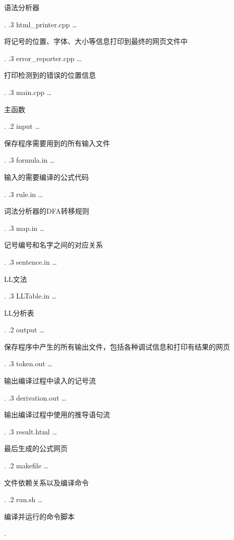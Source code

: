 \documentclass[a4paper]{scrartcl}
\begin{document}
{\begin{minipage}[t]{5cm}
				语法分析器
			\end{minipage}
		.
		.3 html{\_}printer.cpp
		\ldots{}
			\begin{minipage}[t]{6cm}
				将记号的位置、字体、大小等信息打印到最终的网页文件中
			\end{minipage}
		.
		.3 error{\_}reporter.cpp
		\ldots{}
			\begin{minipage}[t]{6cm}
				打印检测到的错误的位置信息
			\end{minipage}
		.
		.3 main.cpp
		\ldots{}
			\begin{minipage}[t]{10cm}
				主函数
			\end{minipage}
		.
	.2 input
	\ldots{}
		\begin{minipage}[t]{10cm}
			保存程序需要用到的所有输入文件
		\end{minipage}
	.
		.3 formula.in
		\ldots{}
			\begin{minipage}[t]{6cm}
				输入的需要编译的公式代码
			\end{minipage}
		.
		.3 rule.in
		\ldots{}
			\begin{minipage}[t]{10cm}
				词法分析器的DFA转移规则
			\end{minipage}
		.
		.3 map.in
		\ldots{}
			\begin{minipage}[t]{10cm}
				记号编号和名字之间的对应关系
			\end{minipage}
		.
		.3 sentence.in
		\ldots{}
			\begin{minipage}[t]{6cm}
				LL文法
			\end{minipage}
		.
		.3 LLTable.in
		\ldots{}
			\begin{minipage}[t]{6cm}
				LL分析表
			\end{minipage}
		.
	.2 output
	\ldots{}
		\begin{minipage}[t]{10cm}
			保存程序中产生的所有输出文件，包括各种调试信息和打印有结果的网页
		\end{minipage}
	.
		.3 token.out
		\ldots{}
			\begin{minipage}[t]{6cm}
				输出编译过程中读入的记号流
			\end{minipage}
		.
		.3 derivation.out
		\ldots{}
			\begin{minipage}[t]{6cm}
				输出编译过程中使用的推导语句流
			\end{minipage}
		.
		.3 result.html
		\ldots{}
			\begin{minipage}[t]{6cm}
				最后生成的公式网页
			\end{minipage}
		.
	.2 makefile
	\ldots{}
		\begin{minipage}[t]{10cm}
			文件依赖关系以及编译命令
		\end{minipage}
	.
	.2 run.sh
	\ldots{}
		\begin{minipage}[t]{10cm}
			编译并运行的命令脚本
		\end{minipage}
	.
}
\end{document}
